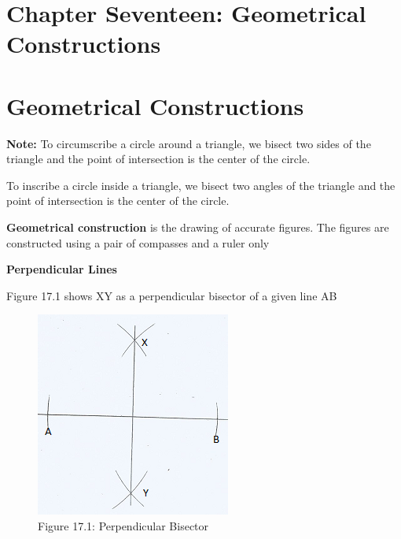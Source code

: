 \documentclass[
  a4paperpaper,
]{scrbook}
\begin{document}

\hypertarget{chapter-seventeen-geometrical-constructions}{%
\chapter{Chapter Seventeen: Geometrical
Constructions}\label{chapter-seventeen-geometrical-constructions}}


\hypertarget{geometrical-constructions}{%
\chapter*{Geometrical Constructions}\label{geometrical-constructions}}


\textbf{Note:} To circumscribe a circle around a triangle, we bisect two
sides of the triangle and the point of intersection is the center of the
circle.

To inscribe a circle inside a triangle, we bisect two angles of the
triangle and the point of intersection is the center of the circle.

\textbf{Geometrical construction} is the drawing of accurate figures.
The figures are constructed using a pair of compasses and a ruler only

\textbf{Perpendicular Lines}

Figure 17.1 shows XY as a perpendicular bisector of a given line AB

\begin{figure}

{\centering \includegraphics{figures/Images/FIG1.png}

}

\caption{Figure 17.1: Perpendicular Bisector}

\end{figure}
\end{document}
